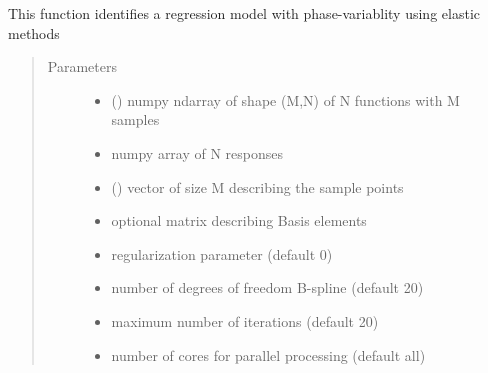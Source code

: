 \documentclass[letterpaper,10pt,english]{sphinxmanual}
\begin{document}

\begin{fulllineitems}
\label{\detokenize{regression:regression.elastic_regression}}
This function identifies a regression model with phase-variablity
using elastic methods
\begin{quote}\begin{description}
\item[{Parameters}] \leavevmode\begin{itemize}
\item {} 
 () \textendash{} numpy ndarray of shape (M,N) of N functions with M samples

\item {} 
 \textendash{} numpy array of N responses

\item {} 
 () \textendash{} vector of size M describing the sample points

\item {} 
 \textendash{} optional matrix describing Basis elements

\item {} 
 \textendash{} regularization parameter (default 0)

\item {} 
 \textendash{} number of degrees of freedom B-spline (default 20)

\item {} 
 \textendash{} maximum number of iterations (default 20)

\item {} 
 \textendash{} number of cores for parallel processing (default all)

\end{itemize}


\end{description}
\end{quote}
\end{fulllineitems}
\end{document}
